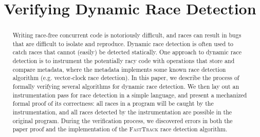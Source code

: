\documentclass[preprint, 10pt]{sigplanconf}
\newcommand{\ignore}[1]{}
\newcommand{\FT}{\textsc{FastTrack}\xspace}
\begin{document}
\setlength{\pdfpageheight}{\paperheight}
\setlength{\pdfpagewidth}{\paperwidth}





\titlebanner{}        %
\preprintfooter{}   %

\title{Verifying Dynamic Race Detection}
\ignore{\authorinfo{William Mansky \and Yuanfeng Peng \and Steve Zdancewic \and Joseph Devietti}
           {University of Pennsylvania}
           {wmansky@seas.upenn.edu, yuanfeng@cis.upenn.edu, stevez@cis.upenn.edu, devietti@cis.upenn.edu}}
\authorinfo{}{}{}
\maketitle

\begin{abstract}
Writing race-free concurrent code is notoriously difficult, and races can result in bugs that are difficult to isolate and reproduce. Dynamic race detection is often used to catch races that cannot (easily) be detected statically. One approach to dynamic race detection is to instrument the potentially racy code with operations that store and compare metadata, where the metadata implements some known race detection algorithm (e.g. vector-clock race detection). In this paper, we describe the process of formally verifying several algorithms for dynamic race detection. We then lay out an instrumentation pass for race detection in a simple language, and present a mechanized formal proof of its correctness: all races in a program will be caught by the instrumentation, and all races detected by the instrumentation are possible in the original program. During the verification process, we discovered errors in both the paper proof and the implementation of the \FT race detection algorithm.
\end{abstract}
\end{document}
